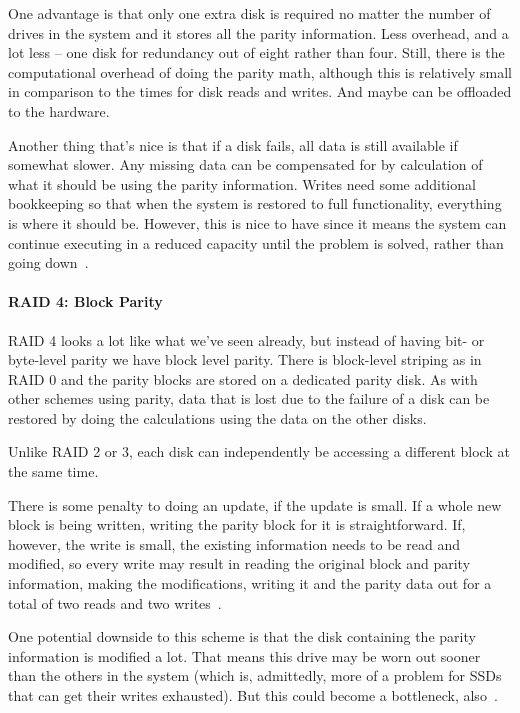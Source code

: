 One advantage is that only one extra disk is required no matter the number of drives in the system and it stores all the parity information. Less overhead, and a lot less -- one disk for redundancy out of eight rather than four. Still, there is the computational overhead of doing the parity math, although this is relatively small in comparison to the times for disk reads and writes. And maybe can be offloaded to the hardware.

Another thing that's nice is that if a disk fails, all data is still available if somewhat slower. Any missing data can be compensated for by calculation of what it should be using the parity information. Writes need some additional bookkeeping so that when the system is restored to full functionality, everything is where it should be. However, this is nice to have since it means the system can continue executing in a reduced capacity until the problem is solved, rather than going down~\cite{osi}.

\paragraph{RAID 4: Block Parity}
RAID 4 looks a lot like what we've seen already, but instead of having bit- or byte-level parity we have block level parity. There is block-level striping as in RAID 0 and the parity blocks are stored on a dedicated parity disk. As with other schemes using parity, data that is lost due to the failure of a disk can be restored by doing the calculations using the data on the other disks.

Unlike RAID 2 or 3, each disk can independently be accessing a different block at the same time. 

There is some penalty to doing an update, if the update is small. If a whole new block is being written, writing the parity block for it is straightforward. If, however, the write is small, the existing information needs to be read and modified, so every write may result in reading the original block and parity information, making the modifications, writing it and the parity data out for a total of two reads and two writes~\cite{osi}.

One potential downside to this scheme is that the disk containing the parity information is modified a lot. That means this drive may be worn out sooner than the others in the system (which is, admittedly, more of a problem for SSDs that can get their writes exhausted). But this could become a bottleneck, also~\cite{osi}.

